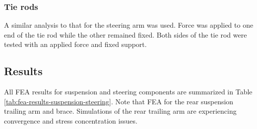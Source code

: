 \documentclass[10pt]{article}
\begin{document}
\subsubsection{Tie rods}
A similar analysis to that for the steering arm was used. Force was applied to one end of the tie rod while the other remained fixed. Both sides of the tie rod were tested with an applied force and fixed support.

\subsection{Results}
All FEA results for suspension and steering components are summarized in Table \ref{tab:fea-results-suspension-steering}. Note that FEA for the rear suspension trailing arm and brace. Simulations of the rear trailing arm are experiencing convergence and stress concentration issues.
\end{document}
